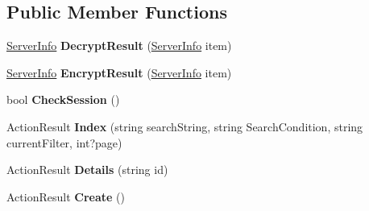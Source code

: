 \subsection*{Public Member Functions}
\begin{DoxyCompactItemize}
\item 
\hyperlink{class_cloud_bread_admin_web_1_1_server_info}{Server\+Info} {\bfseries Decrypt\+Result} (\hyperlink{class_cloud_bread_admin_web_1_1_server_info}{Server\+Info} item)\hypertarget{class_cloud_bread_admin_web_1_1_controllers_1_1_server_info_controller_af02975f969a32d43b30609f50e2fa766}{}\label{class_cloud_bread_admin_web_1_1_controllers_1_1_server_info_controller_af02975f969a32d43b30609f50e2fa766}

\item 
\hyperlink{class_cloud_bread_admin_web_1_1_server_info}{Server\+Info} {\bfseries Encrypt\+Result} (\hyperlink{class_cloud_bread_admin_web_1_1_server_info}{Server\+Info} item)\hypertarget{class_cloud_bread_admin_web_1_1_controllers_1_1_server_info_controller_ab53579e7ec6135afbc53b2971f76db62}{}\label{class_cloud_bread_admin_web_1_1_controllers_1_1_server_info_controller_ab53579e7ec6135afbc53b2971f76db62}

\item 
bool {\bfseries Check\+Session} ()\hypertarget{class_cloud_bread_admin_web_1_1_controllers_1_1_server_info_controller_a693973cf865be8b04add8b26f231e4ea}{}\label{class_cloud_bread_admin_web_1_1_controllers_1_1_server_info_controller_a693973cf865be8b04add8b26f231e4ea}

\item 
Action\+Result {\bfseries Index} (string search\+String, string Search\+Condition, string current\+Filter, int?page)\hypertarget{class_cloud_bread_admin_web_1_1_controllers_1_1_server_info_controller_ad61e3c876659fec97330fdfd0021f9cc}{}\label{class_cloud_bread_admin_web_1_1_controllers_1_1_server_info_controller_ad61e3c876659fec97330fdfd0021f9cc}

\item 
Action\+Result {\bfseries Details} (string id)\hypertarget{class_cloud_bread_admin_web_1_1_controllers_1_1_server_info_controller_aad09cb4d3482c9083610d6dfae088493}{}\label{class_cloud_bread_admin_web_1_1_controllers_1_1_server_info_controller_aad09cb4d3482c9083610d6dfae088493}

\item 
Action\+Result {\bfseries Create} ()\hypertarget{class_cloud_bread_admin_web_1_1_controllers_1_1_server_info_controller_afd86eb746534364881bbb3fb295ae3c0}{}\label{class_cloud_bread_admin_web_1_1_controllers_1_1_server_info_controller_afd86eb746534364881bbb3fb295ae3c0}


\end{DoxyCompactItemize}
